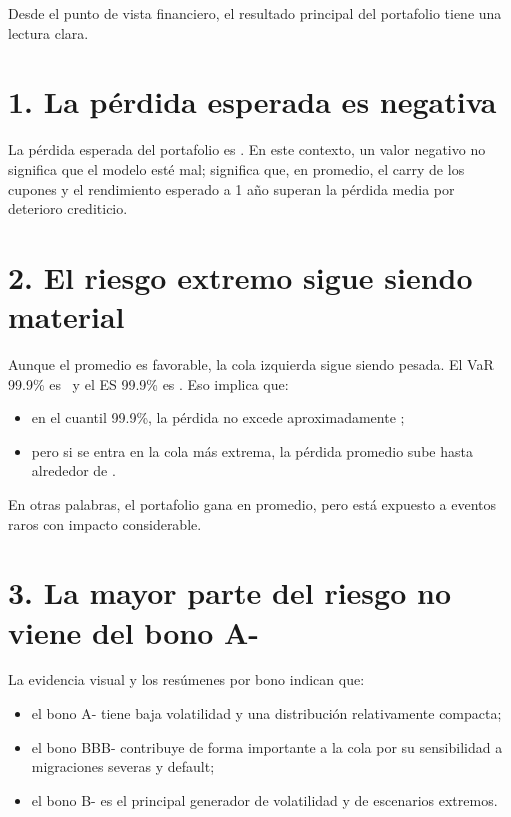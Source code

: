 Desde el punto de vista financiero, el resultado principal del portafolio tiene una lectura clara.

\section*{1. La p\'erdida esperada es negativa}

La p\'erdida esperada del portafolio es \ExpectedLoss. En este contexto, un valor negativo no significa que el modelo est\'e mal; significa que, en promedio, el carry de los cupones y el rendimiento esperado a 1 a\~no superan la p\'erdida media por deterioro crediticio.

\section*{2. El riesgo extremo sigue siendo material}

Aunque el promedio es favorable, la cola izquierda sigue siendo pesada. El VaR 99.9\% es \PortfolioVaR\ y el ES 99.9\% es \PortfolioES. Eso implica que:

\begin{itemize}
  \item en el cuantil 99.9\%, la p\'erdida no excede aproximadamente \PortfolioVaR;
  \item pero si se entra en la cola m\'as extrema, la p\'erdida promedio sube hasta alrededor de \PortfolioES.
\end{itemize}

En otras palabras, el portafolio gana en promedio, pero est\'a expuesto a eventos raros con impacto considerable.

\section*{3. La mayor parte del riesgo no viene del bono A-}

La evidencia visual y los res\'umenes por bono indican que:

\begin{itemize}
  \item el bono A- tiene baja volatilidad y una distribuci\'on relativamente compacta;
  \item el bono BBB- contribuye de forma importante a la cola por su sensibilidad a migraciones severas y default;
  \item el bono B- es el principal generador de volatilidad y de escenarios extremos.
\end{itemize}

